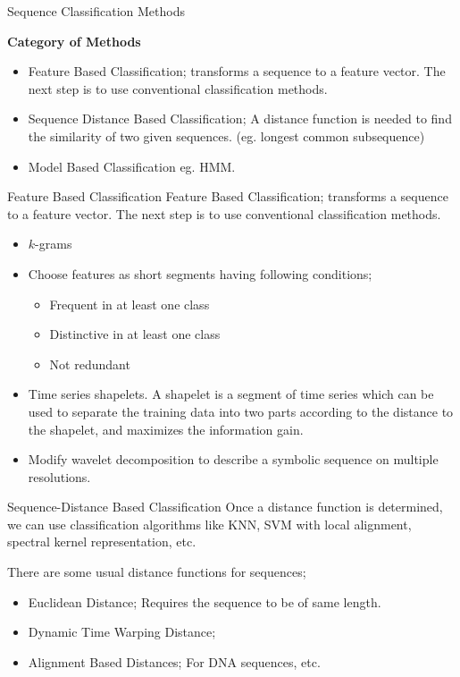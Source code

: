 \documentclass{beamer}
\begin{document}
	\begin{frame}{Sequence Classification Methods}
		\begin{center}
			\textbf{Category of Methods}
		\end{center}
		\begin{itemize}[<+->]
			\item \alert{Feature Based Classification}; transforms a sequence to a feature vector. The next step is to use conventional classification methods.
			\item \alert{Sequence Distance Based Classification}; A distance function is needed to find the similarity of two given sequences. (eg. longest common subsequence)
			\item \alert{Model Based Classification} eg. HMM.
		\end{itemize}
	\end{frame}
	\begin{frame}{Feature Based Classification}
	\alert{Feature Based Classification}; transforms a sequence to a feature vector. The next step is to use conventional classification methods. \pause
		\begin{itemize}
			\item $k$-grams \pause
			\item Choose features as short segments having following conditions;
			\begin{itemize}
				\item Frequent in at least one class
				\item Distinctive in at least one class
				\item Not redundant
			\end{itemize}\pause
			\item \alert{Time series shapelets}. A shapelet is a segment of time series which can be used to separate the training data into two parts according to the distance to the shapelet, and maximizes the information gain.\pause
			\item Modify \alert{wavelet decomposition} to describe a symbolic sequence on multiple resolutions.
		\end{itemize}
	\end{frame}
	\begin{frame}{Sequence-Distance Based Classification}
		Once a distance function is determined, we can use classification algorithms like KNN, SVM with local alignment, spectral kernel representation, etc.
		
		There are some usual distance functions for sequences; 
		\begin{itemize}[<+->]
			\item Euclidean Distance; Requires the sequence to be of same length.
			\item Dynamic Time Warping Distance;
			\item Alignment Based Distances; For DNA sequences, etc.
			
		\end{itemize}
	\end{frame}
\end{document}
